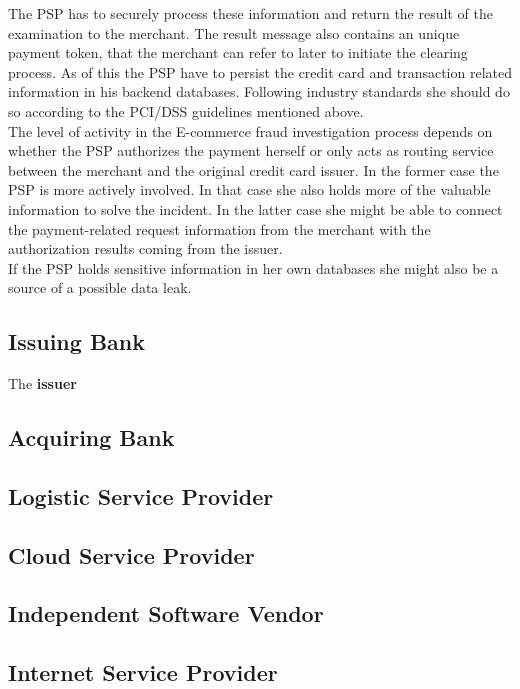 The \gls{PSP} has to securely process these information and return the result of the examination to the merchant. The result message also contains an unique payment token, that the merchant can refer to later to initiate the clearing process. As of this the \gls{PSP} have to persist the credit card and transaction related information in his backend databases. Following industry standards she should do so according to the PCI/DSS guidelines mentioned above.\\

The level of activity in the E-commerce fraud investigation process depends on whether the \gls{PSP} authorizes the payment herself or only acts as routing service between the merchant and the original credit card issuer. In the former case the \gls{PSP} is more actively involved. In that case she also holds more of the valuable information to solve the incident. In the latter case she might be able to connect the payment-related request information from the merchant with the authorization results coming from the issuer.\\

If the \gls{PSP} holds sensitive information in her own databases she might also be a source of a possible data leak.


\subsection{Issuing Bank}
\label{subsec:stakeholder_issuer}

The \textbf{issuer}


\subsection{Acquiring Bank}
\label{subsec:stakeholder_acquirer}


\subsection{Logistic Service Provider}
\label{subsec:stakeholder_lsp}


\subsection{Cloud Service Provider}
\label{subsec:stakeholder_csp}


\subsection{Independent Software Vendor}
\label{subsec:stakeholder_isv}


\subsection{Internet Service Provider}
\label{subsec:stakeholder_isp}


